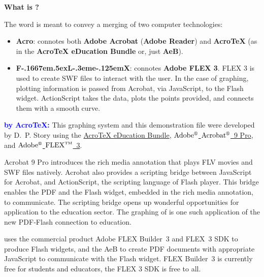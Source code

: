 \documentclass{article}
\begin{document}
\maketitle

\parskip6pt
\begin{center}
    \large\bfseries\color{blue} What is {\AcroFLeX}?
\end{center}

The word \textbf{\AcroFLeX} is meant to convey a merging of two computer technologies:
 \begin{itemize}
 \item \textbf{Acro}: connotes both \textbf{Adobe Acrobat} (\textbf{Adobe Reader})
  and \textbf{{Acro\negthinspace\TeX}} (as in the
 \textbf{{Acro\negthinspace\TeX} eDucation Bundle} or, just \textbf{AeB}).
 \item \textbf{F\kern-.1667em\lower.5ex\hbox{L}\kern-.3eme\kern-.125emX\@}: connotes
       \textbf{Adobe FLEX 3}. FLEX 3 is used to create SWF files to interact with the user.
       In the case of graphing, plotting information is passed from Acrobat, via JavaScript,
       to the Flash widget. ActionScript takes the data, plots the points provided, and
       connects them with a smooth curve.
 \end{itemize}

\textbf{\textcolor{blue}{{\AcroFLeX} by Acro\!\TeX:}} This graphing
system and this demonstration file were developed by D.~P. Story
using the \href{http://www.acrotex.net}{{Acro\!\TeX} eDucation
Bundle}, \href{http://www.adobe.com/products/acrobat/}
{$\text{Adobe}^{\text{\tiny\circledR}}$
$\text{Acrobat}^{\text{\tiny\circledR}}$~9 Pro}, and
\href{http://www.adobe.com/go/flex}{$\text{Adobe}^{\text{\tiny\circledR}}$
$\text{FLEX}^{\text{\tiny TM}}$~3}.

Acrobat 9 Pro introduces the rich media annotation that plays FLV
movies and SWF files natively. Acrobat also provides a scripting
bridge between JavaScript for Acrobat, and ActionScript, the
scripting language of Flash player. This bridge enables the PDF and
the Flash widget, embedded in the rich media annotation, to
communicate. The scripting bridge opens up wonderful opportunities
for application to the education sector. The graphing of {\AcroFLeX}
is one such application of the new PDF-Flash connection to
education.

\textbf{{\AcroFLeX}} uses the commercial product Adobe FLEX
Builder~3 and   FLEX~3 SDK to produce Flash widgets, and the AeB to
create PDF documents with appropriate JavaScript to communicate with
the Flash widget. FLEX Builder~3 is currently free for students and
educators, the FLEX 3 SDK is free to all.
\end{document}
